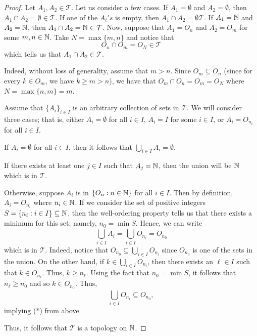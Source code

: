 \documentclass[a4paper]{article}
\begin{document}
\begin{problem}
\begin{enumerate}
\begin{proof}
            Let \( {A}_{1}, {A}_{2} \in \mathcal{T} \). Let us consider a few cases. If \( {A}_{1} = \emptyset  \) and \( {A}_{2} = \emptyset  \), then \( {A}_{1} \cap {A}_{2} = \emptyset \in \mathcal{T} \). If one of the \( {A}_{i}'s \) is empty, then \( {A}_{1} \cap {A}_{2} = \emptyset \mathcal{T} \). If \( {A}_{1} = \mathbb{N}  \) and \( {A}_{2} = \mathbb{N}  \), then \( {A}_{1} \cap {A}_{2} = \mathbb{N} \in \mathcal{T} \). 
            Now, suppose that \( {A}_{1} = {O}_{n} \) and \( {A}_{2} = {O}_{m} \) for some \( m, n \in \mathbb{N} \). Take \( N = \max \{ m, n \}  \) and notice that 
            \[  {O}_{n} \cap {O}_{m} = {O}_{N} \in \mathcal{T}  \]
            which tells us that \({A}_{1} \cap {A}_{2} \in \mathcal{T} \). 

            Indeed, without loss of generality, assume that \( m > n  \). Since \( {O}_{m} \subseteq {O}_{n} \) (since for every \( k \in {O}_{m} \), we have \( k \geq m > n \)), we have that \( {O}_{m} \cap {O}_{n} = {O}_{m} = {O}_{N} \) where \(N = \max \{ n,m  \} = m\). 


            Assume that \(  \{  {A}_{i} \}_{i \in I} \) is an arbitrary collection of sets in \( \mathcal{T} \). We will consider three cases; that is, either \( {A}_{i} = \emptyset \) for all \( i \in I  \), \( {A}_{i} = I  \) for some \( i \in I  \), or \( {A}_{i} = {O}_{{n}_{i}} \) for all \( i \in I \).
           
            If \( {A}_{i} = \emptyset  \) for all \( i \in I \), then it follows that \( \bigcup_{ i \in I  }^{  }  {A}_{i} = \emptyset \). 

            If there exists at least one \( j \in I \) such that \( {A}_{j} = \mathbb{N}  \), then the union will be \( \mathbb{N}  \) which is in \( \mathcal{T} \). 

            Otherwise, suppose \( {A}_{i} \) is in \( \{ {O}_{n} : n \in \mathbb{N} \}  \) for all \( i \in I \). Then by definition, \( {A}_{i} = {O}_{{n}_{i}} \) where \( {n}_{i} \in \mathbb{N} \). If we consider the set of positive integers \( S = \{ {n}_{i} : i \in I \} \subseteq \mathbb{N}  \), then the well-ordering property tells us that there exists a minimum for this set; namely, \( {n}_{0} = \min S \). Hence, we can write 
            \[  \bigcup_{ i \in I }^{  }  {A}_{i} = \bigcup_{ i \in I }^{  } {O}_{{n}_{i}} = {O}_{{n}_{0}} \tag{*} \]
            which is in \( \mathcal{T} \). Indeed, notice that \( {O}_{{n}_{0}} \subseteq \bigcup_{ i \in I  }^{  }  {O}_{{n}_{i}} \) since \( {O}_{{n}_{0}}  \) is one of the sets in the union. On the other hand, if \( k \in \bigcup_{ i \in I }^{  }  {O}_{{n}_{i}} \), then there exists an \( \ell \in I  \) such that \( k \in {O}_{{n}_{\ell}} \). Thus, \( k \geq {n}_{\ell} \). Using the fact that \( {n}_{0} = \min S \), it follows that \( {n}_{\ell } \geq {n}_{0} \) and so \( k \in {O}_{{n}_{0}} \). Thus,     
            \[  \bigcup_{ i \in I  }^{  } {O}_{{n}_{i}} \subseteq {O}_{{n}_{0}}, \]
            implying (*) from above.

            Thus, it follows that \( \mathcal{T} \) is a topology on \( \mathbb{N} \).
            \end{proof}
    \end{enumerate}
\end{problem}
\end{document}
